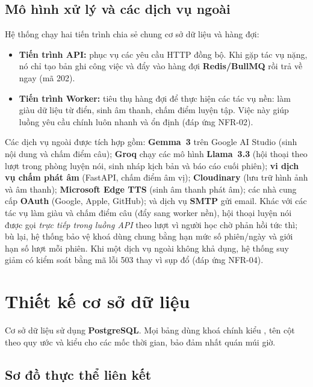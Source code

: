 \subsection{Mô hình xử lý và các dịch vụ ngoài}
\label{subsec:xu-ly-dich-vu-ngoai}

Hệ thống chạy hai tiến trình chia sẻ chung cơ sở dữ liệu và hàng đợi:

\begin{itemize}
  \item \textbf{Tiến trình API:} phục vụ các yêu cầu HTTP đồng bộ. Khi gặp
        tác vụ nặng, nó chỉ tạo bản ghi công việc và đẩy vào hàng đợi
        \textbf{Redis/BullMQ} rồi trả về ngay (mã 202).
  \item \textbf{Tiến trình Worker:} tiêu thụ hàng đợi để thực hiện các tác
        vụ nền: làm giàu dữ liệu từ điển, sinh âm thanh, chấm điểm luyện
        tập. Việc này giúp luồng yêu cầu chính luôn nhanh và ổn định (đáp
        ứng NFR-02).
\end{itemize}

Các dịch vụ ngoài được tích hợp gồm: \textbf{Gemma~3} trên Google AI Studio
(sinh nội dung và chấm điểm câu); \textbf{Groq} chạy các mô hình
\textbf{Llama~3.3} (hội thoại theo lượt trong phòng luyện nói, sinh nháp kịch
bản và báo cáo cuối phiên); \textbf{vi dịch vụ chấm phát âm} (FastAPI, chấm
điểm âm vị); \textbf{Cloudinary} (lưu trữ hình ảnh và âm thanh);
\textbf{Microsoft Edge TTS} (sinh âm thanh phát âm); các nhà cung cấp
\textbf{OAuth} (Google, Apple, GitHub); và dịch vụ \textbf{SMTP} gửi email.
Khác với các tác vụ làm giàu và chấm điểm câu (đẩy sang worker nền), hội thoại
luyện nói được gọi \textit{trực tiếp trong luồng API} theo lượt vì người học chờ
phản hồi tức thì; bù lại, hệ thống bảo vệ khoá dùng chung bằng hạn mức số
phiên/ngày và giới hạn số lượt mỗi phiên. Khi một dịch vụ ngoài không khả dụng,
hệ thống suy giảm có kiểm soát bằng mã lỗi 503 thay vì sụp đổ (đáp ứng NFR-04).

\section{Thiết kế cơ sở dữ liệu}
\label{sec:thiet-ke-csdl}

Cơ sở dữ liệu sử dụng \textbf{PostgreSQL}. Mọi bảng dùng khoá chính kiểu
, tên cột theo quy ước  và kiểu 
cho các mốc thời gian, bảo đảm nhất quán múi giờ.

\subsection{Sơ đồ thực thể liên kết}
\label{subsec:erd}

